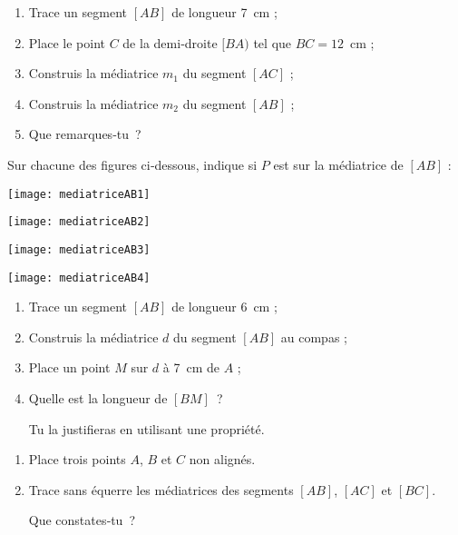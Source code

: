 \begin{exercice}
 \begin{enumerate}
  \item Trace un segment $[AB]$ de longueur 7 cm ;
  \item Place le point $C$ de la demi‑droite $[BA)$ tel que $BC = 12$ cm ;
  \item Construis la médiatrice $m_1$ du segment $[AC]$ ;
  \item Construis la médiatrice $m_2$ du segment $[AB]$ ;
  \item Que remarques‑tu ?
  \end{enumerate}
\end{exercice}


\begin{exercice}[Reconnaître]
Sur chacune des figures ci‑dessous, indique si $P$ est sur la médiatrice de $[AB]$ : \\[0.5em]
 \begin{colenumerate}{2}
  \item 
  
  \texttt{[image: mediatriceAB1]}
  \item 
  
  \texttt{[image: mediatriceAB2]}
  \item 
  
  \texttt{[image: mediatriceAB3]}
  \item 
  
  \texttt{[image: mediatriceAB4]}
  \end{colenumerate}
\end{exercice}
 
 
\begin{exercice}[Construction]
 \begin{enumerate}
 \item Trace un segment $[AB]$ de longueur 6 cm ;
 \item Construis la médiatrice $d$ du segment $[AB]$ au compas ;
 \item Place un point $M$ sur $d$ à 7 cm de $A$ ;
 \item Quelle est la longueur de $[BM]$ ? 
 
Tu la justifieras en utilisant une propriété.
  \end{enumerate}
\end{exercice}


\begin{exercice}
 \begin{enumerate}
 \item Place trois points $A$, $B$ et $C$ non alignés.
 \item Trace sans équerre les médiatrices des segments $[AB]$, $[AC]$ et $[BC]$. 
 
 Que constates‑tu ?
 \end{enumerate}
\end{exercice}

